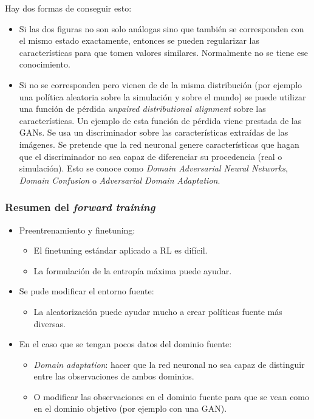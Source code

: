 Hay dos formas de conseguir esto:
\begin{itemize}
    \item Si las dos figuras no son solo análogas sino que también se corresponden con el
        mismo estado exactamente, entonces se pueden regularizar las características para
        que tomen valores similares. Normalmente no se tiene ese conocimiento.
    \item Si no se corresponden pero vienen de de la misma distribución (por ejemplo una política
        aleatoria sobre la simulación y sobre el mundo) se puede utilizar una función de
        pérdida \textit{unpaired distributional alignment} sobre las características. Un
        ejemplo de esta función de pérdida viene prestada de las GANs. Se usa un discriminador
        sobre las características extraídas de las imágenes. Se pretende que la red neuronal
        genere características que hagan que el discriminador no sea capaz de diferenciar su
        procedencia (real o simulación). Esto se conoce como \textit{Domain Adversarial Neural
        Networks}, \textit{Domain Confusion} o \textit{Adversarial Domain Adaptation}.
\end{itemize}

\subsubsection{Resumen del \textit{forward training}}%
\label{ssub:resumen_del_forward training}

\begin{itemize}
    \item Preentrenamiento y finetuning:
        \begin{itemize}
            \item El finetuning estándar aplicado a RL es difícil.
            \item La formulación de la entropía máxima puede ayudar.
        \end{itemize}
    \item Se pude modificar el entorno fuente:
        \begin{itemize}
            \item La aleatorización puede ayudar mucho a crear políticas fuente más diversas.
        \end{itemize}
    \item En el caso que se tengan pocos datos del dominio fuente:
        \begin{itemize}
            \item \textit{Domain adaptation}: hacer que la red neuronal no sea capaz de
                distinguir entre las observaciones de ambos dominios.
            \item O modificar las observaciones en el dominio fuente para que se vean como en
                el dominio objetivo (por ejemplo con una GAN).
        \end{itemize}
\end{itemize}

